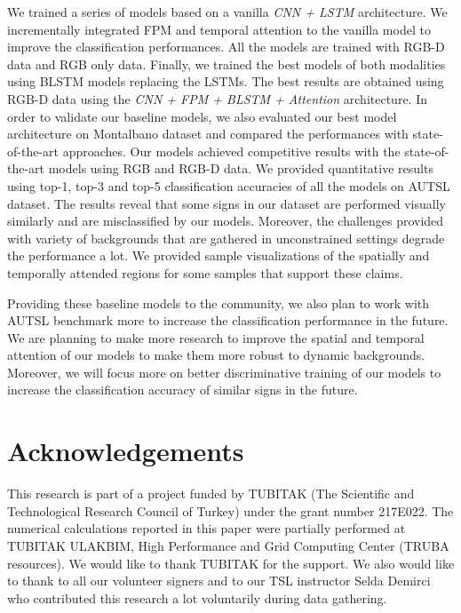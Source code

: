 \documentclass[11pt, a4paper, singlecolumn]{article}
\begin{document}
We trained a series of models based on a vanilla \textit{CNN + LSTM} architecture. We incrementally integrated FPM and temporal attention to the vanilla model to improve the classification performances. All the models are trained with RGB-D data and RGB only data. Finally, we trained the best models of both modalities using BLSTM models replacing the LSTMs. The best results are obtained using RGB-D data using the \textit{CNN + FPM + BLSTM + Attention} architecture. In order to validate our baseline models, we also evaluated our best model architecture on Montalbano dataset and compared the performances with state-of-the-art approaches. Our models achieved competitive results with the state-of-the-art models using RGB and RGB-D data. We provided quantitative results using top-1, top-3 and top-5 classification accuracies of all the models on AUTSL dataset. The results reveal that some signs in our dataset are performed visually similarly and are misclassified by our models. Moreover, the challenges provided with variety of backgrounds that are gathered in unconstrained settings degrade the performance a lot. We provided sample visualizations of the spatially and temporally attended regions for some samples that support these claims. 

Providing these baseline models to the community, we also plan to work with AUTSL benchmark more to increase the classification performance in the future. We are planning to make more research to improve the spatial and temporal attention of our models to make them more robust to dynamic backgrounds. Moreover, we will focus more on better discriminative training of our models to increase the classification accuracy of similar signs in the future. 


	
\section*{Acknowledgements}
This research is part of a project funded by TUBITAK (The Scientific and Technological Research Council of Turkey) under the grant number 217E022. The numerical calculations reported in this paper were partially performed at TUBITAK ULAKBIM, High Performance and Grid Computing Center (TRUBA resources). We would like to thank TUBITAK for the support. We also would like to thank to all our volunteer signers and to our TSL instructor Selda Demirci who contributed this research a lot voluntarily during data gathering.



\footnotesize 
\end{document}
